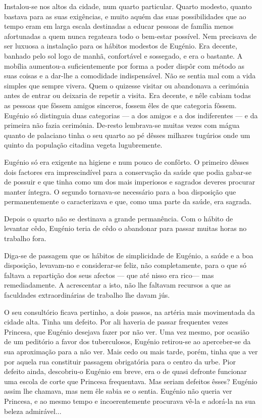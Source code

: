 \documentclass[9pt]{article}
\begin{document}
Instalou-se nos altos da cidade, num quarto particular. Quarto modesto, quanto bastava para as suas exi\-gên\-cias, e muito aquém das suas possibilidades que ao tempo eram em larga escala destinadas a educar pessoas de
fa\-mí\-lia menos afortunadas a quem nunca regateara todo o bem-estar possível. Nem precisava de ser luxuosa a instala\-ção para os hábitos modestos
de Eugé\-nio. Era decente, banhado pelo sol logo de manhã, confortável e
sossegado, e era o bastante. A mobília aumen\-\mbox{tou-a} suficientemente por
forma a poder dispôr com método as suas coisas e a dar-\-lhe a comodidade
indispensável. Não se sentia mal com a vida simples que sempre vivera.
Quem o quizesse visitar ou abandonava a cerimónia antes de entrar ou
deixaria de repetir a visita. Era decente, e nêle cabiam todas as pessoas
que fôssem amigos sinceros, fossem êles de que categoria fôssem. Eugé\-nio
só distinguia duas categorias — a dos amigos e a dos indiferentes —
e da primeira não fazia cerimónia. De-resto lembrava-se muitas vezes
com mágua quanto de palaciano tinha o seu quarto ao pé dêsses mi\-lhares
tugúrios onde um quinto da popula\-ção citadina vegeta lugubremente.

Eugé\-nio só era exigente na higiene e num pouco de con\-fôr\-to. O primeiro dêsses dois factores era imprescindível para a conserva\-ção da saúde
que podia gabar-se de possuir e que tinha como um dos mais imperiosos
e sagrados deveres procurar manter íntegra. O segundo tornava-se necessário para a boa disposi\-ção que permanentemente o ca\-ra\-cte\-ri\-zava e que, como
uma parte da saúde, era sagrada.

Depois o quarto não se destinava a gran\-de permanência. Com o hábito
de levantar cêdo, Eugé\-nio teria de cêdo o abandonar para passar muitas
horas no traba\-lho fora.

Diga-se de passagem que os hábitos de simplicidade de Eugé\-nio, a
saúde e a boa disposi\-ção, levavam-no e considerar-se feliz, não completamente, para o que só faltava a reparti\-ção dos seus afectos — que até
 nisso era rico— mas remediadamente. A acrescentar a isto, não lhe faltavam recursos a que as faculdades extraordinárias de traba\-lho lhe davam jús.

O seu consultório fi\-cava pertinho, a dois passos, na artéria mais movimentada
da cidade alta. Tinha um defeito. Por ali haveria de passar
 frequentes vezes Princesa, que Eugé\-nio desejava fazer por não ver. Uma
 vez mesmo, por ocasião de um peditório a favor dos tuberculosos, Eugé\-nio
 retirou-se ao aperceber-se da sua aproxima\-ção para a não ver. Mais cedo
ou mais tarde, porém, tinha que a ver por aquela rua constituir passagem
obrigatória para o centro da urbe. Pior defeito ainda, descobriu-o Eugé\-nio em breve, era o de quasi defronte funcionar uma escola de corte que
Princesa frequentava. Mas seriam defeitos êsses? Eugé\-nio assim lhe
chamava, mas nem êle sabia se o sentia. Eugé\-nio não queria ver Princesa,
e ao mesmo tempo e incoerentemente procurava vê-la e adorá-la na sua
beleza admirável...
\end{document}
